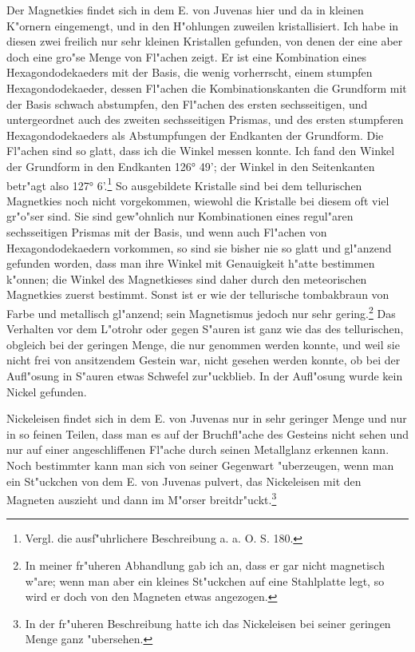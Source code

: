 \documentclass[a4paper, 11pt, oneside]{article}
\begin{document}
Der Magnetkies findet sich in dem E. von Juvenas hier und da in kleinen K"ornern eingemengt, und in den H"ohlungen zuweilen kristallisiert. Ich habe in diesen zwei freilich nur sehr kleinen Kristallen gefunden, von denen der eine aber doch eine gro"se Menge von Fl"achen zeigt. Er ist eine Kombination eines Hexagondodekaeders mit der Basis, die wenig vorherrscht, einem stumpfen Hexagondodekaeder, dessen Fl"achen die Kombinationskanten die Grundform mit der Basis schwach abstumpfen, den Fl"achen des ersten sechsseitigen, und untergeordnet auch des zweiten sechsseitigen Prismas, und des ersten stumpferen Hexagondodekaeders als Abstumpfungen der Endkanten der Grundform. Die Fl"achen sind so glatt, dass ich die Winkel messen konnte. Ich fand den Winkel der Grundform in den Endkanten 126° 49’; der Winkel in den Seitenkanten betr"agt also 127° 6’.\footnote{Vergl. die ausf"uhrlichere Beschreibung a. a. O. S. 180.} So ausgebildete Kristalle sind bei dem tellurischen Magnetkies noch nicht vorgekommen, wiewohl die Kristalle bei diesem oft viel gr"o"ser sind. Sie sind gew"ohnlich nur Kombinationen eines regul"aren sechsseitigen Prismas mit der Basis, und wenn auch Fl"achen von Hexagondodekaedern vorkommen, so sind sie bisher nie so glatt und gl"anzend gefunden worden, dass man ihre Winkel mit Genauigkeit h"atte bestimmen k"onnen; die Winkel des Magnetkieses sind daher durch den meteorischen Magnetkies zuerst bestimmt. Sonst ist er wie der tellurische tombakbraun von Farbe und metallisch gl"anzend; sein Magnetismus jedoch nur sehr gering.\footnote{In meiner fr"uheren Abhandlung gab ich an, dass er gar nicht magnetisch w"are; wenn man aber ein kleines St"uckchen auf eine Stahlplatte legt, so wird er doch von den Magneten etwas angezogen.} Das Verhalten vor dem L"otrohr oder gegen S"auren ist ganz wie das des tellurischen, obgleich bei der geringen Menge, die nur genommen werden konnte, und weil sie nicht frei von ansitzendem Gestein war, nicht gesehen werden konnte, ob bei der Aufl"osung in S"auren etwas Schwefel zur"uckblieb. In der Aufl"osung wurde kein Nickel gefunden.

Nickeleisen findet sich in dem E. von Juvenas nur in sehr geringer Menge und nur in so feinen Teilen, dass man es auf der Bruchfl"ache des Gesteins nicht sehen und nur auf einer angeschliffenen Fl"ache durch seinen Metallglanz erkennen kann. Noch bestimmter kann man sich von seiner Gegenwart "uberzeugen, wenn man ein St"uckchen von dem E. von Juvenas pulvert, das Nickeleisen mit den Magneten auszieht und dann im M"orser breitdr"uckt.\footnote{In der fr"uheren Beschreibung hatte ich das Nickeleisen bei seiner geringen Menge ganz "ubersehen.}
\end{document}
